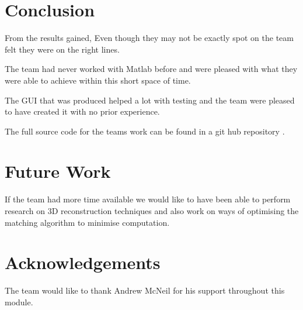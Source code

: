 \documentclass[twocolumn]{article}
\begin{document}
\section{Conclusion}
\vspace{-1ex}

From the results gained, Even though they may not be exactly spot on the team felt they were on the right lines.

The team had never worked with Matlab before and were pleased with what they were able to achieve within this short space of time. 
 
The GUI that was produced helped a lot with testing and the team were pleased to have created it with no prior experience.   

The full source code for the teams work can be found in a git hub repository \cite{githublink}.

\section{Future Work} 
\vspace{-1ex}

If the team had more time available we would like to have been able to perform research on 3D reconstruction techniques and also work on ways of optimising the matching algorithm to minimise computation. 


\section*{Acknowledgements}
The team would like to thank Andrew McNeil for his support throughout this module.





\end{document}
